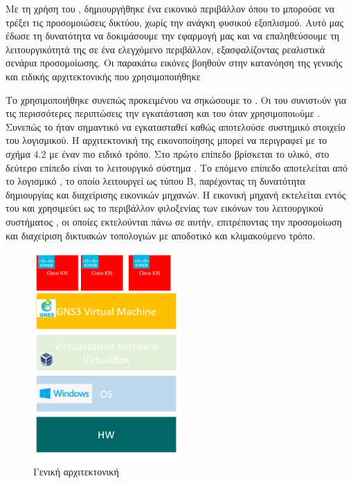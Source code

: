Με τη χρήση του , δημιουργήθηκε ένα εικονικό περιβάλλον όπου το  μπορούσε να τρέξει τις προσομοιώσεις δικτύου, χωρίς την ανάγκη φυσικού εξοπλισμού. Αυτό μας έδωσε τη δυνατότητα να δοκιμάσουμε την εφαρμογή μας και να επαληθεύσουμε τη λειτουργικότητά της σε ένα ελεγχόμενο περιβάλλον, εξασφαλίζοντας ρεαλιστικά σενάρια προσομοίωσης.
Οι παρακάτω εικόνες βοηθούν στην κατανόηση της γενικής και ειδικής αρχιτεκτονικής που χρησιμοποιήθηκε



\FloatBarrier

Το  χρησιμοποιήθηκε συνεπώς προκειμένου να σηκώσουμε το . Οι  του  συνιστoύν για τις περισσότερες περιπτώσεις την εγκατάσταση και του  όταν χρησιμοποιoύμε . Συνεπώς το  ήταν σημαντικό να εγκατασταθεί καθώς αποτελούσε συστημικό στοιχείο του  λογισμικού. Η αρχιτεκτονική της εικονοποίησης μπορεί να περιγραφεί με το σχήμα 4.2 με έναν πιο ειδικό τρόπο. Στο πρώτο επίπεδο βρίσκεται το υλικό, στο δεύτερο επίπεδο είναι το λειτουργικό σύστημα . Το επόμενο επίπεδο αποτελείται από το λογισμικό , το οποίο λειτουργεί ως  τύπου Β, παρέχοντας τη δυνατότητα δημιουργίας και διαχείρισης εικονικών μηχανών. Η εικονική μηχανή  εκτελείται εντός του  και χρησιμεύει ως το περιβάλλον φιλοξενίας των εικόνων του λειτουργικού συστήματος , οι οποίες εκτελούνται πάνω σε αυτήν, επιτρέποντας την προσομοίωση και διαχείριση δικτυακών τοπολογιών με αποδοτικό και κλιμακούμενο τρόπο.



\begin{figure}[htb]
	\centering
	\includegraphics[width=0.5\textwidth]{graphics/virtualization_architecture.PNG}
	\caption{ Γενική αρχιτεκτονική}
\end{figure}

